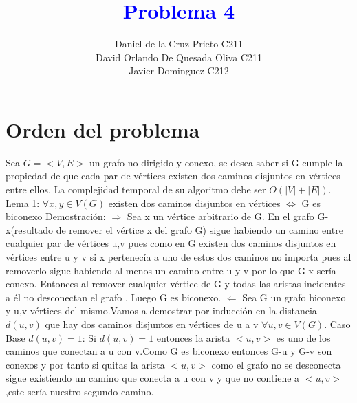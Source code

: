 \documentclass{article}
\begin{document}
    \title{\textcolor{blue}{\textbf{Problema 4 }}\\}
    \author{Daniel de la Cruz Prieto C211\\ David Orlando De Quesada Oliva C211\\Javier Dominguez C212} 
    \date{}
    \maketitle  

    \section*{Orden del problema} 
    Sea $G = <V, E>$ un grafo no dirigido y conexo, se desea saber si G cumple la propiedad de que cada par de
    v\'ertices existen dos caminos disjuntos en v\'ertices entre ellos. La complejidad temporal de su algoritmo debe
    ser $O(|V| + |E|)$.
    \newline
    \newline
    Lema 1:\newline
    $\forall x,y\in V(G)$ existen dos caminos disjuntos en v\'ertices $\Longleftrightarrow$ G es biconexo \newline
    \newline
    Demostraci\'on:\newline
    $\Longrightarrow$\newline
    Sea x un v\'ertice arbitrario de G. En el grafo G-x(resultado de remover el v\'ertice x del grafo G)
    sigue habiendo un camino entre cualquier par de v\'ertices u,v pues como en G existen dos caminos disjuntos en v\'ertices
    entre u y v si x pertenec\'ia a uno de estos dos caminos no importa pues al removerlo sigue habiendo al menos un camino 
    entre u y v por lo que G-x ser\'ia conexo. Entonces al remover cualquier v\'ertice de G y todas las aristas incidentes a
    \'el no desconectan el grafo . Luego G es biconexo.\newline
    $\Longleftarrow$\newline
    Sea G un grafo biconexo y u,v v\'ertices del mismo.Vamos a demostrar por inducci\'on en la distancia $d(u,v)$ que hay
    dos caminos disjuntos en v\'ertices de u a v $\forall u,v \in V(G)$.
    \newline
    Caso Base $d(u,v)=1$:\newline
    Si $d(u,v)=1$ entonces la arista $<u,v>$ es uno de los caminos que conectan a u con v.Como G es biconexo entonces 
    G-u y G-v son conexos y por tanto si quitas la  arista $<u,v>$  como el grafo no se desconecta sigue existiendo
    un camino que conecta a u con v y que no contiene a $<u,v>$ ,este ser\'ia nuestro segundo camino.\newline
    
\end{document}
